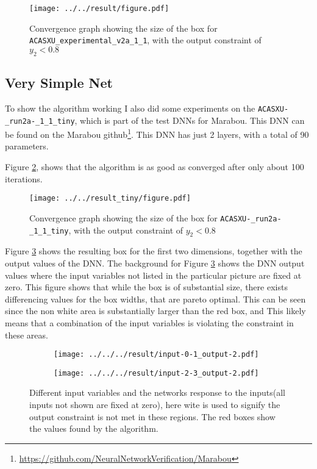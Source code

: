 \documentclass[../main.tex]{subfiles}
\begin{document}
\begin{figure}[H]
    \centering
    \texttt{[image: ../../result/figure.pdf]}
    \caption{Convergence graph showing the size of the box for \texttt{ACASXU\_experimental\_v2a\_1\_1}, with the output constraint of $y_2 < 0.8$ }
    \label{fig:convergence-graph-acas-1}
\end{figure}



\subsection*{Very Simple Net}
To show the algorithm working I also did some experiments on the \texttt{ACASXU-\_run2a-\_1\_1\_tiny}, which is part of the test DNNs for Marabou. This DNN can be found on the Marabou github\footnote{\url{https://github.com/NeuralNetworkVerification/Marabou}}. This DNN has just 2 layers, with a total of 90 parameters.

Figure \ref{fig:convergence-graph-acas-tiny}, shows that the algorithm is as good as converged after only about 100 iterations. 

\begin{figure}[H]
    \centering
    \texttt{[image: ../../result\_tiny/figure.pdf]}
    \caption{Convergence graph showing the size of the box for \texttt{ACASXU-\_run2a-\_1\_1\_tiny}, with the output constraint of $y_2 < 0.8$ }
    \label{fig:convergence-graph-acas-tiny}
\end{figure}
 
Figure \ref{fig:input-0-1_output-2} shows the resulting box for the first two dimensions, together with the output values of the DNN. The background for Figure \ref{fig:input-0-1_output-2} shows the DNN output values where the input variables not listed in the particular picture are fixed at zero. This figure shows that while the box is of substantial size, there exists differencing values for the box widths, that are pareto optimal. This can be seen since the non white area is substantially larger than the red box, and This likely means that a combination of the input variables is violating the constraint in these areas.

\begin{figure}[H]
    \centering
    \begin{subfigure}{0.49\textwidth}
        \texttt{[image: ../../../result/input-0-1\_output-2.pdf]}
    \end{subfigure}
    \begin{subfigure}{0.49\textwidth}
        \texttt{[image: ../../../result/input-2-3\_output-2.pdf]}
    \end{subfigure}
        \caption{Different input variables and the networks response to the inputs(all inputs not shown are fixed at zero), here wite is used to signify the output constraint is not met in these regions. The red boxes show the values found by the algorithm. }
    \label{fig:input-0-1_output-2}
\end{figure}
\end{document}
